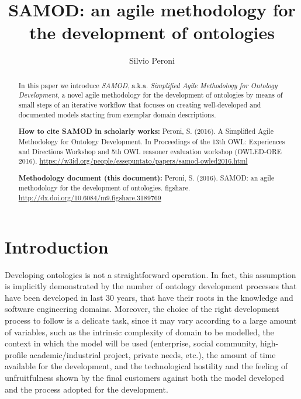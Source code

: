 \documentclass[runningheads,a4paper]{llncs}
\begin{document}
\mainmatter

\title{SAMOD: an agile methodology for the development of ontologies}
\author{Silvio Peroni}

\maketitle

\begin{abstract}
In this paper we introduce {\em SAMOD}, a.k.a. {\em Simplified Agile Methodology for Ontology Development}, a novel agile methodology for the development of ontologies by means of small steps of an iterative workflow that focuses on creating well-developed and documented models starting from exemplar domain descriptions.

{\bf How to cite SAMOD in scholarly works:} Peroni, S. (2016). A Simplified Agile Methodology for Ontology Development. In Proceedings of the 13th OWL: Experiences and Directions Workshop and 5th OWL reasoner evaluation workshop (OWLED-ORE 2016). \url{https://w3id.org/people/essepuntato/papers/samod-owled2016.html} 

{\bf Methodology document (this document):} Peroni, S. (2016). SAMOD: an agile methodology for the development of ontologies. figshare. \url{http://dx.doi.org/10.6084/m9.figshare.3189769} 

\end{abstract}


\section{Introduction}\label{__RefHeading__2452_1461357291}

Developing ontologies is not a straightforward operation. In fact, this assumption is implicitly demonstrated by the number of ontology development processes that have been developed in last 30 years, that have their roots in the knowledge and software engineering domains. Moreover, the choice of the right development process to follow is a delicate task, since it may vary according to a large amount of variables, such as the intrinsic complexity of domain to be modelled, the context in which the model will be used (enterprise, social community, high-profile academic/industrial project, private needs, etc.), the amount of time available for the development, and the technological hostility and the feeling of unfruitfulness shown by the final customers against both the model developed and the process adopted for the development.
\end{document}
